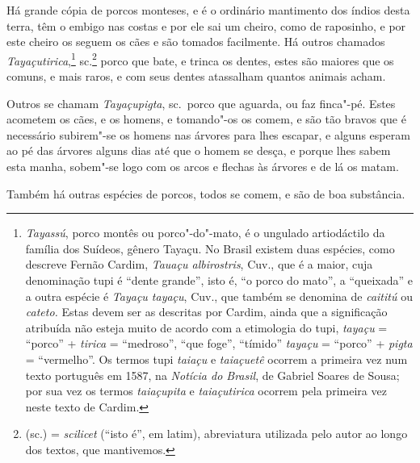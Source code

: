  Há grande cópia de porcos monteses, e é o
ordinário mantimento dos índios desta terra, têm o embigo nas costas e
por ele sai um cheiro, como de raposinho, e por este cheiro os seguem
os cães e são tomados facilmente. Há outros chamados
\textit{Tayaçutirica},\footnote{ \textit{Tayassú}, porco
montês ou porco"-do"-mato, é o ungulado artiodáctilo da família dos
Suídeos, gênero Tayaçu. No Brasil existem duas espécies, como descreve
Fernão Cardim, \textit{Tauaçu albirostris}, Cuv., que é a maior, cuja
denominação tupi é ``dente grande'', isto é, ``o porco do mato'', a ``queixada'' 
e a outra espécie é \textit{Tayaçu tayaçu}, Cuv., que também
se denomina de \textit{caititú} ou \textit{cateto.} Estas devem ser as
descritas por Cardim, ainda que a significação atribuída não esteja
muito de acordo com a etimologia do tupi, \textit{tayaçu} = ``porco'' +
\textit{tirica} = ``medroso'', ``que foge'', ``tímido'' \textit{tayaçu} = 
``porco'' + \textit{pigta} = ``vermelho''. Os termos tupi \textit{taiaçu}
e \textit{taiaçuetê} ocorrem a primeira vez num texto português em
1587, na \textit{Notícia do Brasil}, de Gabriel Soares de Sousa; por
sua vez os termos \textit{taiaçupita} e \textit{taiaçutirica} ocorrem
pela primeira vez neste texto de Cardim.} sc.\footnote{ (sc.) = \textit{scilicet} (``isto é'', em latim), abreviatura utilizada pelo autor 
ao longo dos textos, que mantivemos.} porco que bate, e trinca os
dentes, estes são maiores que os comuns, e mais raros, e com seus
dentes atassalham quantos animais acham.

 Outros se chamam \textit{Tayaçupigta}, sc.~porco que aguarda, ou faz
finca"-pé. Estes acometem os cães, e os homens, e tomando"-os os comem, e
são tão bravos que é necessário subirem"-se os homens nas árvores para
lhes escapar, e alguns esperam ao pé das árvores alguns dias até que o
homem se desça, e porque lhes sabem esta manha, sobem"-se logo com os
arcos e flechas às árvores e de lá os matam. 

Também há outras espécies de porcos, todos se comem, e são de boa substância.

